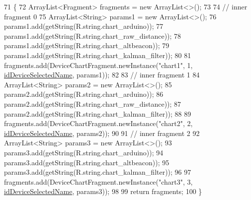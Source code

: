 \begin{DoxyCode}
71                                                \{
72         ArrayList<Fragment> fragments = \textcolor{keyword}{new} ArrayList<>();
73 
74         \textcolor{comment}{// inner fragment 0}
75         ArrayList<String> params1 = \textcolor{keyword}{new} ArrayList<>();
76         params1.add(getString(R.string.chart\_arduino));
77         params1.add(getString(R.string.chart\_raw\_distance));
78         params1.add(getString(R.string.chart\_altbeacon));
79         params1.add(getString(R.string.chart\_kalman\_filter));
80 
81         fragments.add(DeviceChartFragment.newInstance(\textcolor{stringliteral}{"chart1"}, 1, 
      \hyperlink{classit_1_1unibo_1_1torsello_1_1bluetoothpositioning_1_1fragment_1_1DeviceDetailInner2Fragment_a84cd6ba00a3c2e8b7a53cac62c73f1b5_a84cd6ba00a3c2e8b7a53cac62c73f1b5}{idDeviceSelectedName}, params1));
82 
83         \textcolor{comment}{// inner fragment 1}
84         ArrayList<String> params2 = \textcolor{keyword}{new} ArrayList<>();
85         params2.add(getString(R.string.chart\_arduino));
86         params2.add(getString(R.string.chart\_raw\_distance));
87         params2.add(getString(R.string.chart\_kalman\_filter));
88 
89         fragments.add(DeviceChartFragment.newInstance(\textcolor{stringliteral}{"chart2"}, 2, 
      \hyperlink{classit_1_1unibo_1_1torsello_1_1bluetoothpositioning_1_1fragment_1_1DeviceDetailInner2Fragment_a84cd6ba00a3c2e8b7a53cac62c73f1b5_a84cd6ba00a3c2e8b7a53cac62c73f1b5}{idDeviceSelectedName}, params2));
90 
91         \textcolor{comment}{// inner fragment 2}
92         ArrayList<String> params3 = \textcolor{keyword}{new} ArrayList<>();
93         params3.add(getString(R.string.chart\_arduino));
94         params3.add(getString(R.string.chart\_altbeacon));
95         params3.add(getString(R.string.chart\_kalman\_filter));
96 
97         fragments.add(DeviceChartFragment.newInstance(\textcolor{stringliteral}{"chart3"}, 3, 
      \hyperlink{classit_1_1unibo_1_1torsello_1_1bluetoothpositioning_1_1fragment_1_1DeviceDetailInner2Fragment_a84cd6ba00a3c2e8b7a53cac62c73f1b5_a84cd6ba00a3c2e8b7a53cac62c73f1b5}{idDeviceSelectedName}, params3));
98 
99         \textcolor{keywordflow}{return} fragments;
100     \}
\end{DoxyCode}
\hypertarget{classit_1_1unibo_1_1torsello_1_1bluetoothpositioning_1_1fragment_1_1DeviceDetailInner2Fragment_aa925d9adfc96e8228b18330443c52c0d_aa925d9adfc96e8228b18330443c52c0d}{}\label{classit_1_1unibo_1_1torsello_1_1bluetoothpositioning_1_1fragment_1_1DeviceDetailInner2Fragment_aa925d9adfc96e8228b18330443c52c0d_aa925d9adfc96e8228b18330443c52c0d} 
